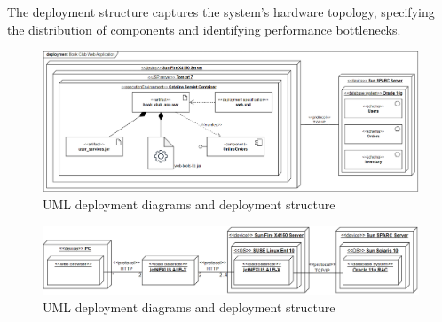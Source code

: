 \begin{itemize}
        The deployment structure captures the system's hardware topology, specifying the distribution of components and identifying performance bottlenecks.
        \begin{figure}[H]
            \centering
            \includegraphics[width=1\columnwidth]{images/allocation1.png}
            \caption{UML deployment diagrams and deployment structure}
        \end{figure}
        \begin{figure}[H]
            \centering
            \includegraphics[width=1\columnwidth]{images/allocation2.png}
            \caption{UML deployment diagrams and deployment structure}
        \end{figure}
\end{itemize}

